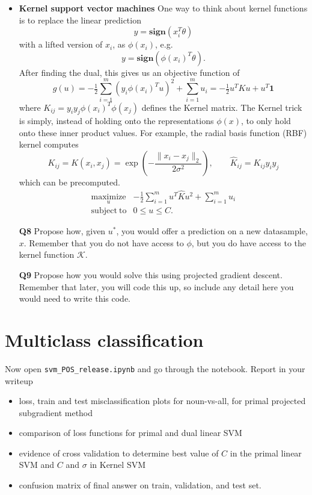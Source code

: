 \documentclass{article}
\newcommand{\maximize}[1]{\underset{#1}{\text{maximize}}}
\newcommand{\mb}{\mathbf}
\newcommand{\sign}{\mathbf{sign}}
\newcommand{\subjto}{\mathrm{subject~to}}
\begin{document}
\begin{itemize}
\item\textbf{Kernel support vector machines} One way to think about kernel functions is to replace the linear prediction 
\[
y = \sign(x_i^T\theta)
\]
with a lifted version of $x_i$, as $\phi(x_i)$, e.g. 
\[
y = \sign(\phi(x_i)^T\theta).
\]
After finding the dual, this gives us an objective function of 
\[
g(u) = -\tfrac{1}{2} \sum_{i=1}^m (y_i\phi(x_i)^Tu)^2  +  \sum_{i=1}^m u_i = -\tfrac{1}{2} u^TKu + u^T\mb 1
\]
where $K_{ij} = y_iy_j\phi(x_i)^T\phi(x_j)$ defines the Kernel matrix. The Kernel trick is simply, instead of holding onto the representations $\phi(x)$, to only hold onto these inner product values. For example, the radial basis function (RBF) kernel computes 
\[
K_{ij} = K(x_i,x_j) = \exp\left(-\frac{\|x_i-x_j\|_2}{2\sigma^2}\right), \qquad \hat K_{ij} = K_{ij}y_iy_j
\]
which can be precomputed. 
\begin{equation}
\begin{array}{ll}
\maximize{u}  & \displaystyle -\tfrac{1}{2} \sum_{i=1}^m u^T\hat Ku^2  +  \sum_{i=1}^m u_i\\
\subjto & 0 \leq u \leq C.
\end{array}
\label{eq:svmdual-kernel}
\end{equation}


\item[\textbf{Q8}] Propose how, given $u^*$, you would offer a prediction on a new datasample, $x$. Remember that you do not have access to $\phi$, but you do have access to the kernel function $\mathcal K$. 

\item[\textbf{Q9}] Propose how you would solve this using projected gradient descent. Remember that later, you will code this up, so include any detail here you would need to write this code.

\end{itemize}

\section{Multiclass classification}
Now open \texttt{svm\_POS\_release.ipynb} and go through the notebook. Report in your writeup
\begin{itemize}
\item   loss, train and test misclassification  plots for noun-vs-all, for primal projected subgradient method
\item   comparison of loss functions for primal and dual linear SVM
\item   evidence of cross validation to determine best value of $C$ in the primal linear SVM and $C$ and $\sigma$ in Kernel SVM
\item   confusion matrix of final answer on train, validation, and test set.
\end{itemize}
\end{document}
